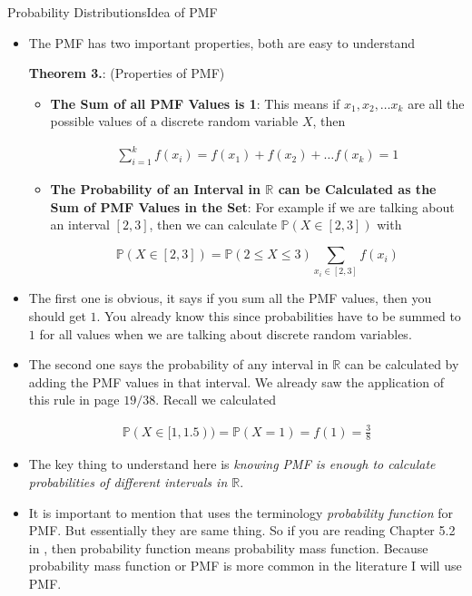 \documentclass[8pt, usepdftitle = false]{beamer}
\newcounter{mytheorem}
\renewcommand{\themytheorem}{3.\arabic{mytheorem}}
\newcommand{\Thm}[1]{\refstepcounter{mytheorem}\textbf{#1\color{blue}\themytheorem}:}
\begin{document}
\begin{frame}[allowframebreaks]{Probability Distributions}{Idea of PMF}
\begin{itemize}
\item The PMF has two important properties, both are easy to understand

\medskip
\begin{varblock}{\Thm{Theorem } (Properties of PMF)}
\begin{itemize}
\item \textbf{The Sum of all PMF Values is 1}: This means if $x_1, x_2, \ldots x_k$ are  all the possible values of a discrete random variable $X$, then 

\begin{align*}
	\sum_{i=1}^{k} f\left(x_i\right)= f(x_1) + f(x_2) + \ldots  f(x_k) = 1
\end{align*}


\item \textbf{The Probability of an Interval in $\mathbb{R}$ can be Calculated as the Sum of PMF Values in the Set}: For example if we are talking about an interval $[2, 3]$, then we can calculate $\mathbb{P}(X \in [2, 3])$ with

$$
\mathbb{P}(X \in [2, 3]) = \mathbb{P}(2 \leq X \leq  3)  \sum_{x_i \in [2, 3]} f\left(x_i\right)
$$
\end{itemize}

\end{varblock}
\medskip

\framebreak


\item The first one is obvious, it says if you sum all the PMF values, then you should get $1$. You already know this since probabilities have to be summed to $1$ for all values when we are talking about discrete random variables. 

\item The second one says the probability of any interval in $\mathbb{R}$ can be calculated by adding the PMF values in that interval. We already saw the application of this rule in page $19/38$. Recall we calculated 

\begin{align*}
\mathbb{P}( X \in [1, 1.5)) = \mathbb{P}(X = 1) = f(1) =  \frac{3}{8}
\end{align*}


\item The key thing to understand here is \emph{knowing PMF is enough to calculate probabilities of different intervals in $\mathbb{R}$}.


\framebreak


\item It is important to mention that \cite{anderson_statistics_2020} uses the terminology \emph{probability function} for PMF. But essentially they are same thing. So if you are reading Chapter 5.2 in \cite{anderson_statistics_2020}, then \alert{probability function} means \alert{probability mass function}. Because probability mass function or PMF is more common in the literature I will use PMF.


\end{itemize}
\end{frame}
\end{document}
